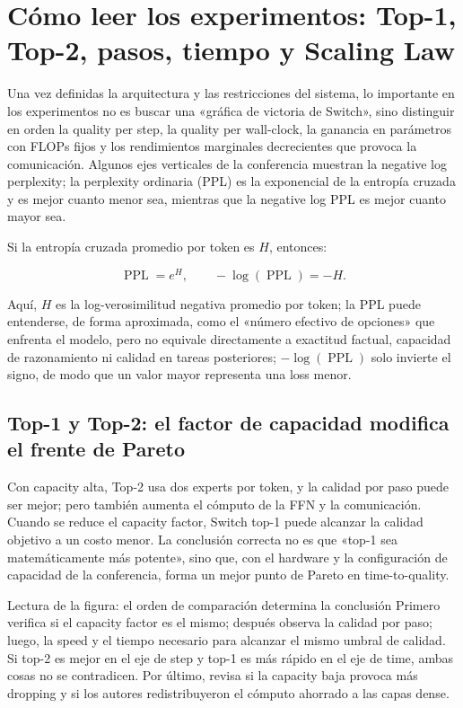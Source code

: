 \section{Cómo leer los experimentos: Top-1, Top-2, pasos, tiempo y Scaling Law}

Una vez definidas la arquitectura y las restricciones del sistema, lo importante en los experimentos no es buscar una «gráfica de victoria de Switch», sino distinguir en orden la quality per step, la quality per wall-clock, la ganancia en parámetros con FLOPs fijos y los rendimientos marginales decrecientes que provoca la comunicación. Algunos ejes verticales de la conferencia muestran la negative log perplexity; la perplexity ordinaria (PPL) es la exponencial de la entropía cruzada y es mejor cuanto menor sea, mientras que la negative log PPL es mejor cuanto mayor sea.

Si la entropía cruzada promedio por token es $H$, entonces:

\[
\operatorname{PPL}=e^{H},\qquad -\log(\operatorname{PPL})=-H.
\]

Aquí, $H$ es la log-verosimilitud negativa promedio por token; la PPL puede entenderse, de forma aproximada, como el «número efectivo de opciones» que enfrenta el modelo, pero no equivale directamente a exactitud factual, capacidad de razonamiento ni calidad en tareas posteriores; $-\log(\operatorname{PPL})$ solo invierte el signo, de modo que un valor mayor representa una loss menor.

\subsection{Top-1 y Top-2: el factor de capacidad modifica el frente de Pareto}

Con capacity alta, Top-2 usa dos experts por token, y la calidad por paso puede ser mejor; pero también aumenta el cómputo de la FFN y la comunicación. Cuando se reduce el capacity factor, Switch top-1 puede alcanzar la calidad objetivo a un costo menor. La conclusión correcta no es que «top-1 sea matemáticamente más potente», sino que, con el hardware y la configuración de capacidad de la conferencia, forma un mejor punto de Pareto en time-to-quality.


\begin{knowledgebox}{Lectura de la figura: el orden de comparación determina la conclusión}
Primero verifica si el capacity factor es el mismo; después observa la calidad por paso; luego, la speed y el tiempo necesario para alcanzar el mismo umbral de calidad. Si top-2 es mejor en el eje de step y top-1 es más rápido en el eje de time, ambas cosas no se contradicen. Por último, revisa si la capacity baja provoca más dropping y si los autores redistribuyeron el cómputo ahorrado a las capas dense.
\end{knowledgebox}

